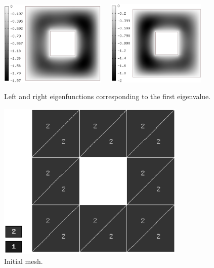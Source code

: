 \documentclass[smallextended]{svjour3}
\begin{document}
\begin{figure}[!ht]
\begin{center}
\includegraphics[width=0.45\textwidth]{hole1.eps}\ \ \ 
\includegraphics[width=0.42\textwidth]{hole2.eps}
\end{center}
\caption{Left and right eigenfunctions corresponding to the first eigenvalue.}
\label{fig:holef}
\end{figure}

\begin{figure}[!ht]
\begin{center}
\includegraphics[width=0.8\textwidth]{hole_mesh.eps}
\end{center}
\caption{Initial mesh.}
\label{fig:hole_mesh}
\end{figure}
\end{document}
